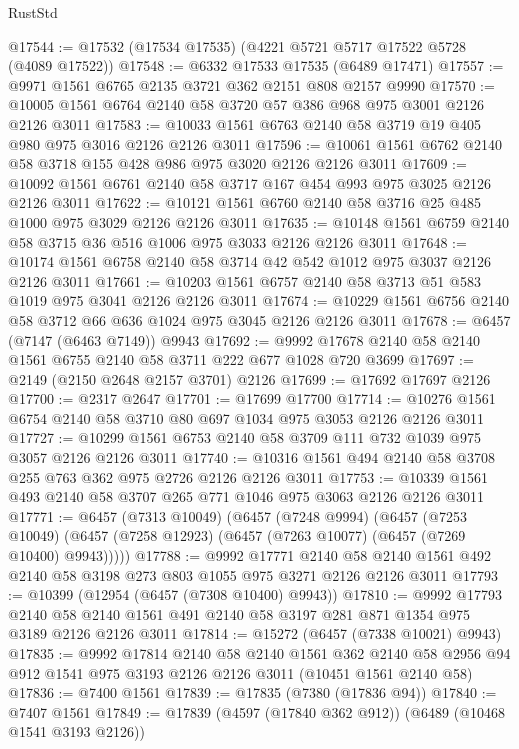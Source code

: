 \begin{lexlean}{RustStd}
\begin{coremodule}
@17544 := @17532 (@17534 @17535) (@4221 @5721 @5717 @17522 @5728 (@4089 @17522))
@17548 := @6332 @17533 @17535 (@6489 @17471)
@17557 := @9971 @1561 @6765 @2135 @3721 @362 @2151 @808 @2157 @9990
@17570 := @10005 @1561 @6764 @2140 @58 @3720 @57 @386 @968 @975 @3001 @2126 @2126 @3011
@17583 := @10033 @1561 @6763 @2140 @58 @3719 @19 @405 @980 @975 @3016 @2126 @2126 @3011
@17596 := @10061 @1561 @6762 @2140 @58 @3718 @155 @428 @986 @975 @3020 @2126 @2126 @3011
@17609 := @10092 @1561 @6761 @2140 @58 @3717 @167 @454 @993 @975 @3025 @2126 @2126 @3011
@17622 := @10121 @1561 @6760 @2140 @58 @3716 @25 @485 @1000 @975 @3029 @2126 @2126 @3011
@17635 := @10148 @1561 @6759 @2140 @58 @3715 @36 @516 @1006 @975 @3033 @2126 @2126 @3011
@17648 := @10174 @1561 @6758 @2140 @58 @3714 @42 @542 @1012 @975 @3037 @2126 @2126 @3011
@17661 := @10203 @1561 @6757 @2140 @58 @3713 @51 @583 @1019 @975 @3041 @2126 @2126 @3011
@17674 := @10229 @1561 @6756 @2140 @58 @3712 @66 @636 @1024 @975 @3045 @2126 @2126 @3011
@17678 := @6457 (@7147 (@6463 @7149)) @9943
@17692 := @9992 @17678 @2140 @58 @2140 @1561 @6755 @2140 @58 @3711 @222 @677 @1028 @720 @3699
@17697 := @2149 (@2150 @2648 @2157 @3701) @2126
@17699 := @17692 @17697 @2126
@17700 := @2317 @2647
@17701 := @17699 @17700
@17714 := @10276 @1561 @6754 @2140 @58 @3710 @80 @697 @1034 @975 @3053 @2126 @2126 @3011
@17727 := @10299 @1561 @6753 @2140 @58 @3709 @111 @732 @1039 @975 @3057 @2126 @2126 @3011
@17740 := @10316 @1561 @494 @2140 @58 @3708 @255 @763 @362 @975 @2726 @2126 @2126 @3011
@17753 := @10339 @1561 @493 @2140 @58 @3707 @265 @771 @1046 @975 @3063 @2126 @2126 @3011
@17771 := @6457
    (@7313 @10049)
    (@6457
      (@7248 @9994)
      (@6457
        (@7253 @10049)
        (@6457 (@7258 @12923) (@6457 (@7263 @10077) (@6457 (@7269 @10400) @9943)))))
@17788 := @9992
    @17771
    @2140
    @58
    @2140
    @1561
    @492
    @2140
    @58
    @3198
    @273
    @803
    @1055
    @975
    @3271
    @2126
    @2126
    @3011
@17793 := @10399 (@12954 (@6457 (@7308 @10400) @9943))
@17810 := @9992
    @17793
    @2140
    @58
    @2140
    @1561
    @491
    @2140
    @58
    @3197
    @281
    @871
    @1354
    @975
    @3189
    @2126
    @2126
    @3011
@17814 := @15272 (@6457 (@7338 @10021) @9943)
@17835 := @9992
    @17814
    @2140
    @58
    @2140
    @1561
    @362
    @2140
    @58
    @2956
    @94
    @912
    @1541
    @975
    @3193
    @2126
    @2126
    @3011
    (@10451 @1561 @2140 @58)
@17836 := @7400 @1561
@17839 := @17835 (@7380 (@17836 @94))
@17840 := @7407 @1561
@17849 := @17839 (@4597 (@17840 @362 @912)) (@6489 (@10468 @1541 @3193 @2126))

\end{coremodule}
\end{lexlean}
